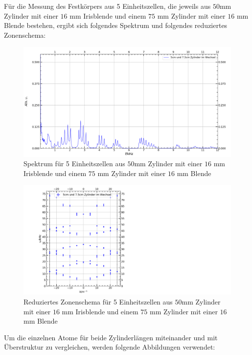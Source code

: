 \documentclass[german,  %
parskip=full,  %
]{scrartcl}
\begin{document}
\\\\
Für die Messung des Festkörpers aus 5 Einheitszellen, die jeweils aus $50$mm Zylinder mit einer $16$ mm Irisblende und einem $75$ mm Zylinder mit einer $16$ mm Blende bestehen, ergibt sich folgendes Spektrum und folgendes reduziertes Zonenschema:
\newpage
\begin{figure}[h!]
\centering
\includegraphics[width=\textwidth]{4632_Uebersichtsspektrum.png}
\caption{Spektrum für 5 Einheitszellen aus $50$mm Zylinder mit einer $16$ mm Irisblende und einem $75$ mm Zylinder mit einer $16$ mm Blende}
\end{figure}
\begin{figure}[h!]
\centering
\includegraphics[scale=0.325]{4632_reduziertes_Zonenschema.png}
\caption{Reduziertes Zonenschema für 5 Einheitszellen aus $50$mm Zylinder mit einer $16$ mm Irisblende und einem $75$ mm Zylinder mit einer $16$ mm Blende}
\end{figure}
Um die einzelnen Atome für beide Zylinderlängen miteinander und mit Überstruktur zu vergleichen, werden folgende Abbildungen verwendet:
\end{document}
